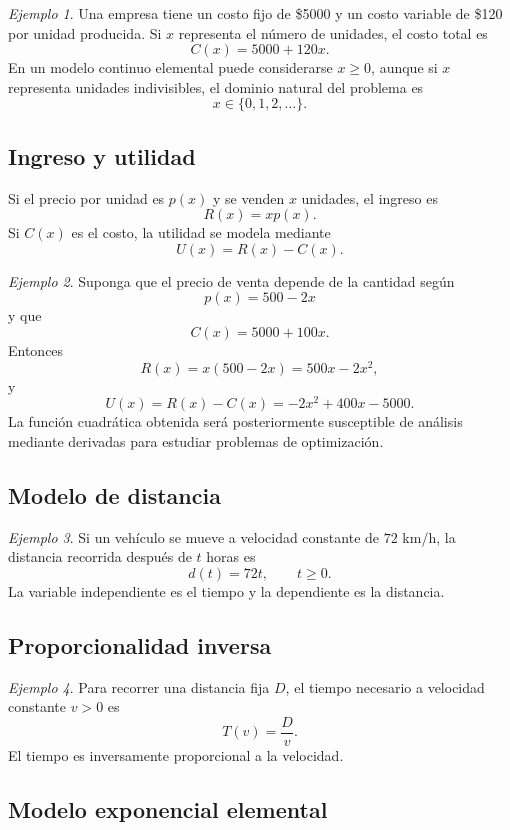 \documentclass[12pt]{article}
\theoremstyle{remark}
\newtheorem{ejemplo}{Ejemplo}[section]
\begin{document}
\begin{ejemplo}
Una empresa tiene un costo fijo de \$5000 y un costo variable de \$120 por
unidad producida. Si $x$ representa el número de unidades, el costo total es
\[
C(x)=5000+120x.
\]
En un modelo continuo elemental puede considerarse $x\geq0$, aunque si $x$
representa unidades indivisibles, el dominio natural del problema es
\[
x\in\{0,1,2,\ldots\}.
\]
\end{ejemplo}

\subsection{Ingreso y utilidad}

Si el precio por unidad es $p(x)$ y se venden $x$ unidades, el ingreso es
\[
R(x)=xp(x).
\]
Si $C(x)$ es el costo, la utilidad se modela mediante
\[
U(x)=R(x)-C(x).
\]

\begin{ejemplo}
Suponga que el precio de venta depende de la cantidad según
\[
p(x)=500-2x
\]
y que
\[
C(x)=5000+100x.
\]
Entonces
\[
R(x)=x(500-2x)=500x-2x^2,
\]
y
\[
U(x)=R(x)-C(x)
=-2x^2+400x-5000.
\]
La función cuadrática obtenida será posteriormente susceptible de análisis
mediante derivadas para estudiar problemas de optimización.
\end{ejemplo}

\subsection{Modelo de distancia}

\begin{ejemplo}
Si un vehículo se mueve a velocidad constante de $72$ km/h, la distancia
recorrida después de $t$ horas es
\[
d(t)=72t,\qquad t\geq0.
\]
La variable independiente es el tiempo y la dependiente es la distancia.
\end{ejemplo}

\subsection{Proporcionalidad inversa}

\begin{ejemplo}
Para recorrer una distancia fija $D$, el tiempo necesario a velocidad constante
$v>0$ es
\[
T(v)=\frac{D}{v}.
\]
El tiempo es inversamente proporcional a la velocidad.
\end{ejemplo}

\subsection{Modelo exponencial elemental}
\end{document}
